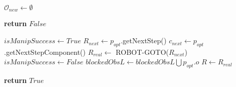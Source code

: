 \begin{algorithm}[H]
\begin{algorithmic}[1]

  \end{algorithmic}

\end{algorithm}

\begin{algorithm}[H]

  \label{alg:01-wu-optimized-part2}

  \begin{algorithmic}[1]

            
            \State $\mathcal{O}_{new} \gets \emptyset$

          \EndIf
            \State \textbf{return} $False$ 
          \EndIf

          \State $isManipSuccess \gets True$
          \State $R_{next} \gets p_{opt}$.getNextStep() 
          \State $c_{next} \gets p_{opt}$.getNextStepComponent()
          \State $R_{real} \gets$ ROBOT-GOTO($R_{next}$)
            \State $isManipSuccess \gets False$
            \State $blockedObsL \gets blockedObsL \bigcup p_{opt}.o$
          \EndIf
          \State $R \gets R_{real}$

        \EndWhile

        \State \textbf{return} $True$

    \EndProcedure

  \end{algorithmic}

\end{algorithm}
